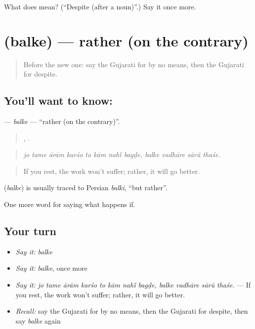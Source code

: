 \begin{tcolorbox}[breakable,colback=teal!4,colframe=teal!35!black,title={Before you move on}]
What does  mean? (\textquotedblleft{}Despite (after a noun)\textquotedblright{}.) Say it once more.
\end{tcolorbox}
\section[\texorpdfstring{\gu{બલકે} (balke)}{બલકે (balke)}]{ (balke) — rather (on the contrary)}

\label{lesson:GU-C547-balke}



\begin{quote}
Before the new one: say the Gujarati for by no means, then the Gujarati for despite.
\end{quote}

\subsection*{You'll want to know: }
\textbf{} — \emph{balke} — \textquotedblleft{}rather (on the contrary)\textquotedblright{}.

\begin{quote}
       ,    .
\end{quote}

\begin{quote}
\emph{jo tame ārām karśo to kām nahī̃ bagḍe, balke vadhāre sārũ thaśe.}
\end{quote}

\begin{quote}
If you rest, the work won't suffer; rather, it will go better.
\end{quote}

\begin{cousinweb}
\textbf{} (\emph{balke}) is usually traced to Persian \emph{balki}, \textquotedblleft{}but rather\textquotedblright{}.
\end{cousinweb}

\begin{grammarlens}[title={What you've built}]
One more word for saying what happens if.
\end{grammarlens}

\subsection*{Your turn}
\begin{itemize}
\raggedright
  \item \emph{Say it:} \emph{balke}
  \item \emph{Say it:} \emph{balke}, once more
  \item \emph{Say it:} \emph{jo tame ārām karśo to kām nahī̃ bagḍe, balke vadhāre sārũ thaśe.} — If you rest, the work won't suffer; rather, it will go better.
  \item \emph{Recall:} say the Gujarati for by no means, then the Gujarati for despite, then say \emph{balke} again
\end{itemize}

